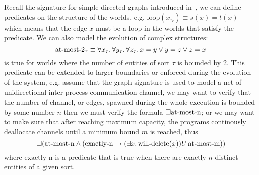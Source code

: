 \begin{example}
  Recall the signature for simple directed graphs introduced in~, we can define predicates on the
  structure of the worlds, e.g. $\text{loop}(x_{\tau_e}) \equiv s(x) = t(x)$ which means that the edge $x$ must be a
  loop in the worlds that satisfy the predicate. We can also model the evolution of complex structures: 
  \[\text{at-most-2}_\tau \equiv \forall {x_\tau} \ldotp {\forall {y_\tau} \ldotp {\forall {z_\tau} \ldotp {x = y \lor y = z \lor z = x}}}\] is
  true for worlds where the number of entities of sort $\tau$ is bounded by 2. This predicate can be extended to larger
  boundaries or enforced during the evolution of the system, e.g. assume that the graph signature is used to model a net
  of unidirectional inter-process communication channel, we may want to verify that the number of channel, or edges,
  spawned during the whole execution is bounded by some number $n$ then we must verify the formula
  $\Box{\text{at-most-n}}$; or we may want to make sure that after reaching maximum capacity, the programs
  continously deallocate channels until a minimum bound $m$ is reached, thus \[\Box{(\text{at-most-n} \land (\text{exactly-n} \to
  {(\exists {x} \ldotp {\text{will-delete}(x)})}U\,{\text{at-most-m}}))}\] where $\text{exactly-n}$ is a predicate that
  is true when there are exactly $n$ distinct entities of a given sort.
\end{example}
